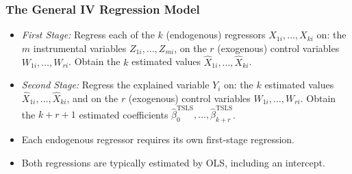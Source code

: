\begin{frame}
\frametitle{The General IV Regression Model}
\begin{itemize}
\item \emph{First Stage:} 
\medskip\newline
Regress each of the $k$ (endogenous) regressors $X_{1i},\ldots,X_{ki}$ on:
\medskip\newlinequad
the $m$ instrumental variables $Z_{1i},\ldots,Z_{mi}$,
\newlinequad
on the $r$ (exogenous) control variables $W_{1i},\ldots,W_{ri}$. 
\medskip\newlinequad
Obtain the $k$ estimated values $\hat{X}_{1i},\ldots,\hat{X}_{ki}$.
\item \emph{Second Stage:} 
\medskip\newline
Regress the explained variable $Y_{i}$ on: 
\medskip\newlinequad
the $k$ estimated values $\hat{X}_{1i},\ldots,\hat{X}_{ki}$, and
\newlinequad
on the $r$ (exogenous) control variables $W_{1i},\ldots,W_{ri}$. 
\medskip\newlinequad
Obtain the $k+r+1$ estimated coefficients $\hat{\beta}^{\text{TSLS}}_{0},\ldots,\hat{\beta}^{\text{TSLS}}_{k+r}$.
\item Each endogenous regressor requires its own first-stage regression. 
\item Both regressions are typically estimated by OLS, including an intercept.
\end{itemize}
\end{frame}
